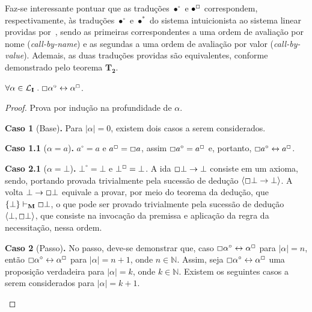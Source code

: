         Faz-se interessante pontuar que as traduções $\bullet^\circ$ e $\bullet^\Box$ correspondem, respectivamente, às traduções $\bullet^\circ$ e $\bullet^*$ do sistema intuicionista ao sistema linear providas por~\cite{Girard}, sendo as primeiras correspondentes a uma ordem de avaliação por nome (\textit{call-by-name}) e as segundas a uma ordem de avaliação por valor (\textit{call-by-value}). 
        Ademais, as duas traduções providas são equivalentes, conforme demonstrado pelo teorema $\mathbf{T_2}$.

        \begin{theorem}
            $\forall\alpha\in\mathcal{L}_\mathbf{I}\mathrel{.}\Box\alpha^\circ\leftrightarrow\alpha^\Box$.
        \end{theorem}

        \begin{proof}
            Prova por indução na profundidade de $\alpha$.

            \begin{case}
                \textbf{Caso 1} (Base)\textbf{.}
                    Para $|\alpha| = 0$, existem dois casos a serem considerados.

                    \begin{case}
                    \textbf{Caso 1.1} ($\alpha = a$)\textbf{.}
                        $a^\circ = a$ e $a^\Box = \Box a$, assim $\Box a^\circ = a^\Box$ e, portanto, $\Box a^\circ \leftrightarrow a^\Box$.
                    \end{case}
                    \begin{case}
                    \textbf{Caso 2.1} ($\alpha = \bot$)\textbf{.}
                        $\bot^\circ = \bot$ e $\bot^\Box = \bot$. A ida $\Box\bot\to\bot$ consiste em um axioma, sendo, portando provada trivialmente pela sucessão de dedução $\langle\Box\bot\to\bot\rangle$.
                        A volta $\bot\to\Box\bot$ equivale a provar, por meio do teorema da dedução, que $\{\bot\}\vdash_\mathbf{M}\Box\bot$, o que pode ser provado trivialmente pela sucessão de dedução $\langle\bot, \Box\bot\rangle$, que consiste na invocação da premissa e aplicação da regra da necessitação, nessa ordem.
                    \end{case}
            \end{case}

            \begin{case}
                \textbf{Caso 2} (Passo)\textbf{.} No passo, deve-se demonstrar que, caso $\Box\alpha^\circ\leftrightarrow\alpha^\Box$ para $|\alpha| = n$, 
                então $\Box\alpha^\circ\leftrightarrow\alpha^\Box$ para $|\alpha| = n + 1$, onde $n \in \mathbb{N}$. Assim, seja $\Box\alpha^\circ\leftrightarrow\alpha^\Box$ uma proposição verdadeira para $|\alpha| = k$, onde $k \in \mathbb{N}$. Existem os seguintes casos a serem considerados para $|\alpha| = k + 1$.


\end{case}
\end{proof}
